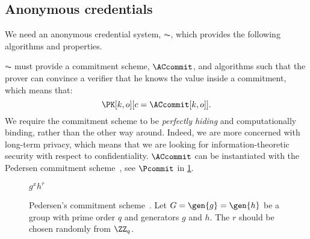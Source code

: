 \subsection{Anonymous credentials}%
\label{ZK-anon-cred}


We need an anonymous credential system, \(\AC\), which provides the following algorithms and properties.

\(\AC\) must provide a commitment scheme, \(\ACcommit\), and algorithms such that the prover can convince a verifier that he knows the value inside a commitment, which means that:
\begin{equation*}
  \PK[k, o][c = \ACcommit[k,o]].
\end{equation*}
We require the commitment scheme to be \emph{perfectly hiding} and computationally binding, rather than the other way around.
Indeed, we are more concerned with long-term privacy, which means that we are looking for information-theoretic security with respect to confidentiality.
\(\ACcommit\) can be instantiated with the Pedersen commitment 
scheme~\cite{PedersenCommitment}, see \(\Pcommit\) in \cref{ACcommitAlg}.

\begin{figure}
  \small
  \begin{algorithmic}
    \State \Return $g^x h^r$
    \EndFunction
  \end{algorithmic}
  \caption{\label{ACcommitAlg}%
    Pedersen's commitment scheme~\cite{PedersenCommitment}.
    Let \(G = \gen{g} = \gen{h}\) be a group with prime order \(q\) and 
    generators \(g\) and \(h\).%
    The \(r\) should be chosen randomly from \(\ZZ_q\).
  }
\end{figure}


